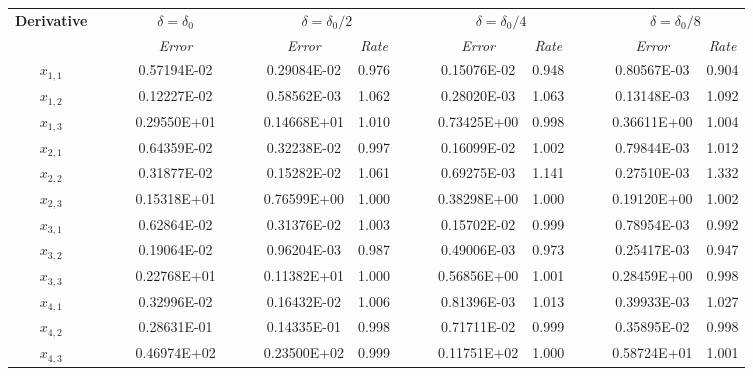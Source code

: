 \begin{table}[t]
\tiny
\begin{center}
	\begin{tabular}{ @{}cccc  cccc  cccc @{} }
\toprule[0.1em] 
\multirow{2}{*}{\bf Derivative} & $\phantom{abs}$ &  \multicolumn{1}{c}{$\delta = \delta_0$}& $\phantom{abs}$  & \multicolumn{2}{c}{$\delta = \delta_0/2$}& $\phantom{abs}$  & \multicolumn{2}{c}{$\delta = \delta_0/4$}& $\phantom{abs}$  & \multicolumn{2}{c}{$\delta = \delta_0/8$} \\
		         \cmidrule[0.05em]{3-3}  \cmidrule[0.05em](lr){5-6}  \cmidrule[0.05em]{8-9}   \cmidrule[0.05em]{11-12}
&	& {\sl Error}	&& {\sl Error}	& {\sl Rate} && {\sl Error}	& {\sl Rate}&& {\sl Error}	& {\sl Rate} \\
\midrule[0.05em]
$ x_{ 1,1}$  && 0.57194E-02 &&  0.29084E-02 &   0.976  && 0.15076E-02 &   0.948 && 0.80567E-03  &   0.904 \\  
$ x_{ 1,2}$  && 0.12227E-02 &&  0.58562E-03 &   1.062  && 0.28020E-03 &   1.063 && 0.13148E-03  &   1.092 \\
$ x_{ 1,3}$  && 0.29550E+01 &&  0.14668E+01 &   1.010  && 0.73425E+00 &   0.998 && 0.36611E+00  &   1.004 \\
$ x_{ 2,1}$  && 0.64359E-02 &&  0.32238E-02 &   0.997  && 0.16099E-02 &   1.002 && 0.79844E-03  &   1.012 \\
$ x_{ 2,2}$  && 0.31877E-02 &&  0.15282E-02 &   1.061  && 0.69275E-03 &   1.141 && 0.27510E-03  &   1.332 \\
$ x_{ 2,3}$  && 0.15318E+01 &&  0.76599E+00 &   1.000  && 0.38298E+00 &   1.000 && 0.19120E+00  &   1.002 \\
$ x_{ 3,1}$  && 0.62864E-02 &&  0.31376E-02 &   1.003  && 0.15702E-02 &   0.999 && 0.78954E-03  &   0.992 \\
$ x_{ 3,2}$  && 0.19064E-02 &&  0.96204E-03 &   0.987  && 0.49006E-03 &   0.973 && 0.25417E-03  &   0.947 \\
$ x_{ 3,3}$  && 0.22768E+01 &&  0.11382E+01 &   1.000  && 0.56856E+00 &   1.001 && 0.28459E+00  &   0.998 \\
$ x_{ 4,1}$  && 0.32996E-02 &&  0.16432E-02 &   1.006  && 0.81396E-03 &   1.013 && 0.39933E-03  &   1.027 \\
$ x_{ 4,2}$  && 0.28631E-01 &&  0.14335E-01 &   0.998  && 0.71711E-02 &   0.999 && 0.35895E-02  &   0.998 \\
$ x_{ 4,3}$  && 0.46974E+02 &&  0.23500E+02 &   0.999  && 0.11751E+02 &   1.000 && 0.58724E+01  &   1.001 \\

\end{tabular}
\end{center}
\end{table}
